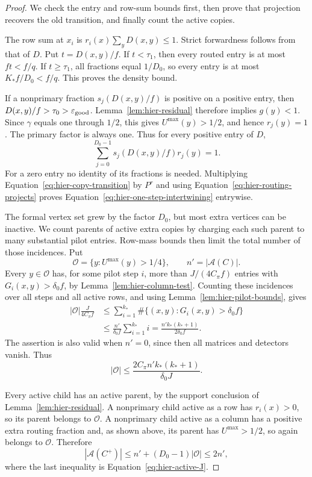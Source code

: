 \begin{proof}
We check the entry and row-sum bounds first, then prove that projection recovers the old transition, and finally count the active copies.

The row sum at $x_i$ is $r_i(x)\sum_yD(x,y)\leq1$.  Strict
forwardness follows from that of $D$.  Put $t=D(x,y)/f$.  If
$t<\tau_1$, then every routed entry is at most $ft<f/q$.  If
$t\geq\tau_1$, all fractions equal $1/D_0$, so every entry is at
most $K_*f/D_0<f/q$.  This proves the density bound.

If a nonprimary fraction $s_j(D(x,y)/f)$ is positive on a positive
entry, then $D(x,y)/f>\tau_0>\varepsilon_{\rm good}$.
Lemma~\ref{lem:hier-residual} therefore implies $g(y)<1$.
Since $\gamma$ equals one through $1/2$, this gives
$U^{\max}(y)>1/2$, and hence $r_j(y)=1$.  The primary factor is
always one.  Thus for every positive entry of $D$,
\begin{equation}
 \sum_{j=0}^{D_0-1}s_j(D(x,y)/f)r_j(y)=1.
 \label{eq:hier-routing-projects}
\end{equation}
For a zero entry no identity of its fractions is needed.  Multiplying
Equation~\eqref{eq:hier-copy-transition} by $P^r$ and using
Equation~\eqref{eq:hier-routing-projects} proves
Equation~\eqref{eq:hier-one-step-intertwining} entrywise.

The formal vertex set grew by the factor $D_0$, but most extra vertices can be inactive. We count parents of active extra copies by charging each such parent to many substantial pilot entries. Row-mass bounds then limit the total number of those incidences. Put
\[
 \mathcal O=\{y:U^{\max}(y)>1/4\},\qquad
 n'=|\mathcal A(C)|.
\]
Every $y\in\mathcal O$ has, for some pilot step $i$, more than
$J/(4C_\pi f)$ entries with $G_i(x,y)>\delta_0f$, by
Lemma~\ref{lem:hier-column-test}.  Counting these incidences over all
steps and all active rows, and using
Lemma~\ref{lem:hier-pilot-bounds}, gives
\begin{align*}
 |\mathcal O|\frac{J}{4C_\pi f}
 &\leq\sum_{i=1}^{k_*}\#\{(x,y):G_i(x,y)>\delta_0f\}\\
 &\leq\frac{n'}{\delta_0f}\sum_{i=1}^{k_*}i
   =\frac{n'k_*(k_*+1)}{2\delta_0f}.
\end{align*}
The assertion is also valid when $n'=0$, since then all matrices and
detectors vanish.  Thus
\[
 |\mathcal O|\leq
       \frac{2C_\pi n'k_*(k_*+1)}{\delta_0J}.
\]

Every active child has an active parent, by the support conclusion of
Lemma~\ref{lem:hier-residual}.  A nonprimary child active as a row has
$r_i(x)>0$, so its parent belongs to $\mathcal O$.  A nonprimary
child active as a column has a positive extra routing fraction and, as
shown above, its parent has $U^{\max}>1/2$, so again belongs to
$\mathcal O$.  Therefore
\[
 |\mathcal A(C^+)|\leq n'+(D_0-1)|\mathcal O|\leq2n',
\]
where the last inequality is Equation~\eqref{eq:hier-active-J}.
\end{proof}

